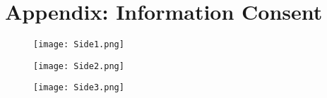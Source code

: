 \chapter{Appendix: Information Consent}
\begin{figure}
\texttt{[image: Side1.png]}
\end{figure}

\begin{figure}
    \centering
    \texttt{[image: Side2.png]}
\end{figure}

\begin{figure}
    \centering
    \texttt{[image: Side3.png]}
\end{figure}